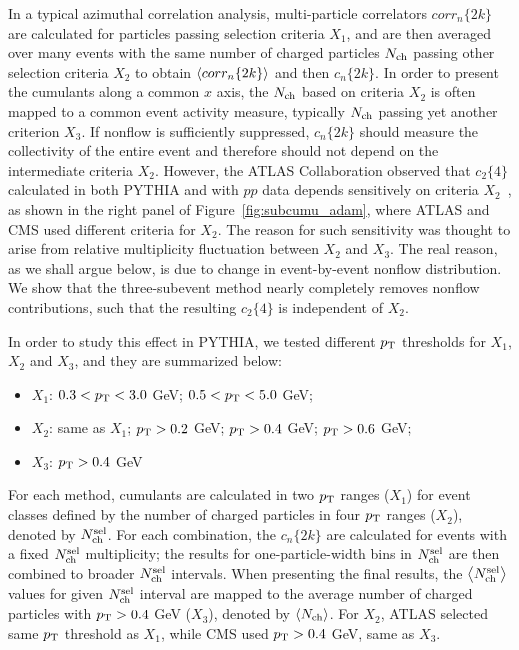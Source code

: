 In a typical azimuthal correlation analysis, multi-particle correlators $corr_n\{2k\}$ are calculated for particles passing selection criteria $X_1$, and are then averaged over many events with the same number of charged particles $N_\text{ch}$ passing other selection criteria $X_2$ to obtain $\left\langle corr_n\{2k\}\right\rangle$ and then $c_n\{2k\}$. In order to present the cumulants along a common $x$ axis, the $N_\text{ch}$ based on criteria $X_2$ is often mapped to a common event activity measure, typically $N_\text{ch}$ passing yet another criterion $X_3$. If nonflow is sufficiently suppressed, $c_n\{2k\}$ should measure the collectivity of the entire event and therefore should not depend on the intermediate criteria $X_2$. However, the ATLAS Collaboration observed that $c_2\{4\}$ calculated in both PYTHIA and with $pp$ data depends sensitively on criteria $X_2$~\cite{Aaboud:2017acw}, as shown in the right panel of Figure~\ref{fig:subcumu_adam}, where ATLAS and CMS used different criteria for $X_2$. The reason for such sensitivity was thought to arise from relative multiplicity fluctuation between $X_2$ and $X_3$. The real reason, as we shall argue below, is due to change in event-by-event nonflow distribution. We show that the three-subevent method nearly completely removes nonflow contributions, such that the resulting $c_2\{4\}$ is independent of $X_2$.

In order to study this effect in PYTHIA, we tested different $p_\text{T}$ thresholds for $X_1$, $X_2$ and $X_3$, and they are summarized below:
\begin{itemize}
\item $X_1$: $0.3<p_\text{T}<3.0$ GeV; $0.5<p_\text{T}<5.0$ GeV;
\item $X_2$: same as $X_1$; $p_\text{T}>0.2$ GeV; $p_\text{T}>0.4$ GeV; $p_\text{T}>0.6$ GeV;
\item $X_3$: $p_\text{T}>0.4$ GeV
\end{itemize}
For each method, cumulants are calculated in two $p_\text{T}$ ranges ($X_1$) for event classes defined by the number of charged particles in four $p_\text{T}$ ranges ($X_2$), denoted by $N_\text{ch}^\text{sel}$. For each combination, the $c_n\{2k\}$ are calculated for events with a fixed $N_\text{ch}^\text{sel}$ multiplicity; the results for one-particle-width bins in $N_\text{ch}^\text{sel}$ are then combined to broader $N_\text{ch}^\text{sel}$ intervals. When presenting the final results, the $\left\langle N_\text{ch}^\text{sel}\right\rangle$ values for given $N_\text{ch}^\text{sel}$ interval are mapped to the average number of charged particles with $p_\text{T}>0.4$ GeV ($X_3$), denoted by $\left\langle N_\text{ch}\right\rangle$. For $X_2$, ATLAS selected same $p_\text{T}$ threshold as $X_1$, while CMS used $p_\text{T}>0.4$ GeV, same as $X_3$.



